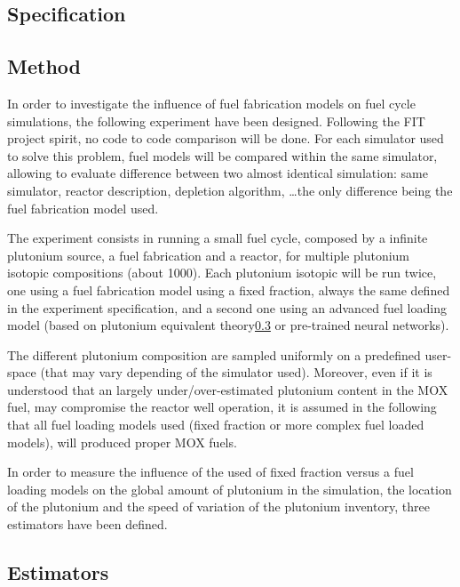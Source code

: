 \subsection{Specification}

\subsection{Method}
In order to investigate the influence of fuel fabrication models on fuel cycle
simulations, the following experiment have been designed. Following the FIT
project spirit, no code to code comparison will be done. For each simulator used
to solve this problem, fuel models will be compared within the same simulator,
allowing to evaluate difference between two almost identical simulation: same
simulator, reactor description, depletion algorithm, \ldots the only difference
being the fuel fabrication model used.

The experiment consists in running a small fuel cycle, composed by a infinite
plutonium source, a fuel fabrication and a reactor, for multiple plutonium
isotopic compositions (about 1000). Each plutonium isotopic will be run twice,
one using a fuel fabrication model using a fixed fraction, always the same
defined in the experiment specification, and a second one using an advanced fuel
loading model (based on plutonium equivalent theory\ref{} or pre-trained neural
networks). 

The different plutonium composition are sampled uniformly on a predefined
user-space (that may vary depending of the simulator used). Moreover, even if
it is understood that an largely under/over-estimated plutonium content in the
MOX fuel, may compromise the reactor well operation, it is assumed in the
following that all fuel loading models used (fixed fraction or more complex fuel
loaded models), will produced proper MOX fuels.

In order to measure the influence of the used of fixed fraction versus a fuel
loading models on the global amount of plutonium in the simulation, the location
of the plutonium and the speed of variation of the plutonium inventory, three
estimators have been defined.

\subsection{Estimators}
